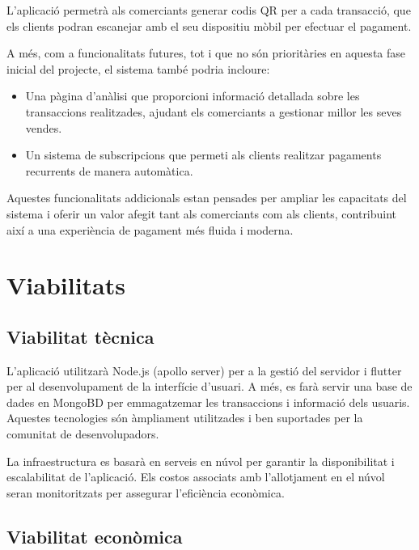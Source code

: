 \documentclass[a4paper,12pt,twoside]{ThesisStyle}
\begin{document}
L'aplicació permetrà als comerciants generar codis QR per a cada transacció, que els clients podran escanejar amb el seu dispositiu mòbil per efectuar el pagament.

A més, com a funcionalitats futures, tot i que no són prioritàries en aquesta fase inicial del projecte, el sistema també podria incloure:

\begin{itemize}
  \item Una pàgina d'anàlisi que proporcioni informació detallada sobre les transaccions realitzades, ajudant els comerciants a gestionar millor les seves vendes.
  \item Un sistema de subscripcions que permeti als clients realitzar pagaments recurrents de manera automàtica.
\end{itemize}

Aquestes funcionalitats addicionals estan pensades per ampliar les capacitats del sistema i oferir un valor afegit tant als comerciants com als clients, contribuint així a una experiència de pagament més fluida i moderna.



\chapter{Viabilitats}
\label{chp:viabilitats}

\section{Viabilitat tècnica}
\label{subsec:Viabilitat tècnica}

L'aplicació utilitzarà Node.js (apollo server) per a la gestió del servidor i flutter per al desenvolupament de la interfície d'usuari. A més, es farà servir una base de dades en MongoBD per emmagatzemar les transaccions i informació dels usuaris. Aquestes tecnologies són àmpliament utilitzades i ben suportades per la comunitat de desenvolupadors.

La infraestructura es basarà en serveis en núvol per garantir la disponibilitat i escalabilitat de l'aplicació. Els costos associats amb l'allotjament en el núvol seran monitoritzats per assegurar l'eficiència econòmica.

\section{Viabilitat econòmica}
\label{subsec:Viabilitat económica}
\end{document}
